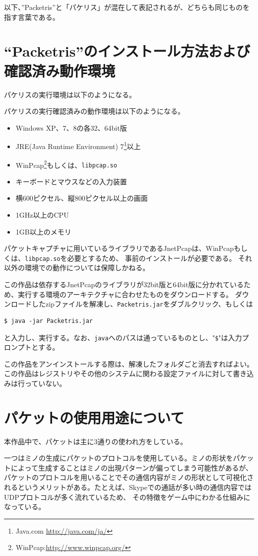 \documentclass[11pt,a4paper]{jsarticle}
\begin{document}
以下、''Packetris''と「パケリス」が混在して表記されるが、どちらも同じものを指す言葉である。


\section{``Packetris''のインストール方法および確認済み動作環境}
パケリスの実行環境は以下のようになる。

パケリスの実行確認済みの動作環境は以下のようになる。
\begin{itemize}
\item Windows XP、7、8の各32、64bit版
\item JRE(Java Runtime Environment) 7\footnote{Java.com \url{http://java.com/ja/}}以上
\item WinPcap\footnote{WinPcap:\url{http://www.winpcap.org/}}もしくは、{\tt libpcap.so}
\item キーボードとマウスなどの入力装置
\item 横600ピクセル、縦800ピクセル以上の画面
\item 1GHz以上のCPU
\item 1GB以上のメモリ
\end{itemize}
パケットキャプチャに用いているライブラリであるJnetPcap\cite{jnetpcap}は、WinPcapもしくは、{\tt libpcap.so}を必要とするため、
事前のインストールが必要である。
それ以外の環境での動作については保障しかねる。

この作品は依存するJnetPcapのライブラリが32bit版と64bit版に分かれているため、実行する環境のアーキテクチャに合わせたものをダウンロードする。
ダウンロードしたzipファイルを解凍し、{\tt Packetris.jar}をダブルクリック、もしくは
\begin{lstlisting}
$ java -jar Packetris.jar
\end{lstlisting}
と入力し、実行する。なお、{\tt java}へのパスは通っているものとし、"\verb+$+"は入力プロンプトとする。

この作品をアンインストールする際は、解凍したフォルダごと消去すればよい。この作品はレジストリやその他のシステムに関わる設定ファイルに対して書き込みは行っていない。

\section{パケットの使用用途について}
本作品中で、パケットは主に3通りの使われ方をしている。

一つはミノの生成にパケットのプロトコルを使用している。ミノの形状をパケットによって生成することはミノの出現パターンが偏ってしまう可能性があるが、
パケットのプロトコルを用いることでその通信内容がミノの形状として可視化されるというメリットがある。たとえば、Skypeでの通話が多い時の通信内容ではUDPプロトコルが多く流れているため、
その特徴をゲーム中にわかる仕組みになっている。
\end{document}
